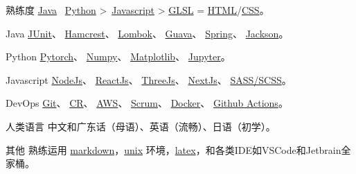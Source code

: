 
\begin{cvskills}

  \cvskill
    {熟练度}
    {\href{https://www.java.com/en/}{Java} \approx \, \href{https://www.python.org/}{Python} >\, \href{https://www.javascript.com/}{Javascript} > \href{https://www.khronos.org/opengl/wiki/OpenGL_Shading_Language}{GLSL} = \href{https://developer.mozilla.org/en-US/docs/Glossary/HTML5}{HTML}/\href{https://developer.mozilla.org/en-US/docs/Web/CSS}{CSS}。}
  
  \cvskill
    {Java} %
    {\href{https://junit.org/junit4/}{JUnit}、 \href{http://hamcrest.org/JavaHamcrest/index}{Hamcrest}、 \href{https://projectlombok.org/}{Lombok}、 \href{https://github.com/google/guava}{Guava}、 \href{https://spring.io/}{Spring}、 \href{https://github.com/FasterXML/jackson}{Jackson}。}  %

  \cvskill
    {Python} %
    {\href{https://pytorch.org/}{Pytorch}、 \href{https://numpy.org/}{Numpy}、 \href{https://matplotlib.org/}{Matplotlib}、 \href{https://jupyter.org/}{Jupyter}。}  %

  \cvskill
    {Javascript} %
    {\href{https://nodejs.org/en/}{NodeJs}、 \href{https://reactjs.org/}{ReactJs}、 \href{https://threejs.org/}{ThreeJs}、 \href{https://nextjs.org/}{NextJs}、 \href{https://sass-lang.com/}{SASS/SCSS}。}
  
  \cvskill
    {DevOps} %
    {\href{https://git-scm.com/}{Git}、 \href{https://en.wikipedia.org/wiki/Code_review}{CR}、 \href{https://aws.amazon.com/}{AWS}、 \href{https://www.scrum.org/resources/what-is-scrum}{Scrum}、 \href{https://www.docker.com/}{Docker}、 \href{https://github.com/features/actions}{Github Actions}。}
 
  \cvskill
    {人类语言}
    {中文和广东话（母语）、英语（流畅）、日语（初学）。}

  \cvskill
    {其他} %
    {熟练运用 \href{https://en.wikipedia.org/wiki/Markdown}{markdown}，\href{https://en.wikipedia.org/wiki/Unix}{unix} 环境，\href{https://www.latex-project.org/}{latex}，和各类IDE如VSCode和Jetbrain全家桶。}

\end{cvskills}
